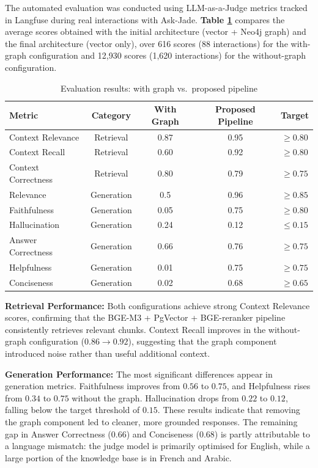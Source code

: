 The automated evaluation was conducted using LLM-as-a-Judge metrics
tracked in Langfuse during real interactions with Ask-Jade.
\textbf{Table \ref{tab:results_comparison}} compares the average scores obtained
with the initial architecture (vector + Neo4j graph) and the final
architecture (vector only), over 616 scores (88 interactions)
for the with-graph configuration and 12,930 scores
(1,620 interactions) for the without-graph configuration.

\begin{table}[H]
\centering
\caption{Evaluation results: with graph vs.\ proposed pipeline}
\label{tab:results_comparison}
\renewcommand{\arraystretch}{1.3}
\begin{tabular}{|l|c|c|c|c|}
\hline
\textbf{Metric} & \textbf{Category} & \textbf{With Graph} & \textbf{Proposed Pipeline} & \textbf{Target} \\
\hline
Context Relevance   & Retrieval  & 0.87 & 0.95 & $\geq 0.80$ \\
\hline
Context Recall      & Retrieval  & 0.60 & 0.92 & $\geq 0.80$ \\
\hline
Context Correctness & Retrieval  & 0.80 & 0.79 & $\geq 0.75$ \\
\hline
Relevance           & Generation & 0.5   & 0.96 & $\geq 0.85$ \\
\hline
Faithfulness        & Generation & 0.05 & 0.75 & $\geq 0.80$ \\
\hline
Hallucination       & Generation & 0.24 & 0.12 & $\leq 0.15$ \\
\hline
Answer Correctness  & Generation & 0.66   & 0.76 & $\geq 0.75$ \\
\hline
Helpfulness         & Generation & 0.01 & 0.75 & $\geq 0.75$ \\
\hline
Conciseness         & Generation & 0.02 & 0.68 & $\geq 0.65$ \\
\hline
\end{tabular}
\end{table}

\textbf{Retrieval Performance: }
Both configurations achieve strong Context Relevance scores, confirming
that the BGE-M3 + PgVector + BGE-reranker pipeline consistently retrieves
relevant chunks. Context Recall improves in the without-graph
configuration ($0.86 \to 0.92$), suggesting that the graph component
introduced noise rather than useful additional context.

\textbf{Generation Performance: }
The most significant differences appear in generation metrics.
Faithfulness improves from $0.56$ to $0.75$, and Helpfulness rises
from $0.34$ to $0.75$ without the graph. Hallucination drops from
$0.22$ to $0.12$, falling below the target threshold of $0.15$.
These results indicate that removing the graph component led to
cleaner, more grounded responses. The remaining gap in Answer
Correctness ($0.66$) and Conciseness ($0.68$) is partly attributable
to a language mismatch: the judge model is primarily optimised for
English, while a large portion of the knowledge base is in French
and Arabic.


